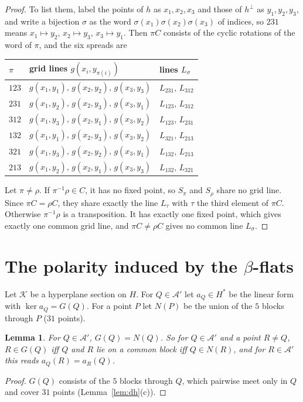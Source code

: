 \documentclass[11pt]{amsart}
\newtheorem{lemma}[theorem]{Lemma}
\theoremstyle{definition}
\newcommand{\K}{\mathcal{K}}
\newcommand{\A}{\mathcal{A}}
\begin{document}
\begin{proof}
To list them, label the points of $h$ as $x_1,x_2,x_3$ and those of $h^\perp$ as $y_1,y_2,y_3$, and write a bijection $\sigma$ as the word $\sigma(x_1)\sigma(x_2)\sigma(x_3)$ of indices, so $231$ means $x_1\mapsto y_2$, $x_2\mapsto y_3$, $x_3\mapsto y_1$. Then $\pi C$ consists of the cyclic rotations of the word of $\pi$, and the six spreads are
\begin{center}\small
\begin{tabular}{@{}lll@{}}
$\pi$ & grid lines $g(x_i,y_{\pi(i)})$ & lines $L_\sigma$\\\hline
$123$ & $g(x_1,y_1),\,g(x_2,y_2),\,g(x_3,y_3)$ & $L_{231},\,L_{312}$\\
$231$ & $g(x_1,y_2),\,g(x_2,y_3),\,g(x_3,y_1)$ & $L_{123},\,L_{312}$\\
$312$ & $g(x_1,y_3),\,g(x_2,y_1),\,g(x_3,y_2)$ & $L_{123},\,L_{231}$\\
$132$ & $g(x_1,y_1),\,g(x_2,y_3),\,g(x_3,y_2)$ & $L_{321},\,L_{213}$\\
$321$ & $g(x_1,y_3),\,g(x_2,y_2),\,g(x_3,y_1)$ & $L_{132},\,L_{213}$\\
$213$ & $g(x_1,y_2),\,g(x_2,y_1),\,g(x_3,y_3)$ & $L_{132},\,L_{321}$
\end{tabular}
\end{center}

Let $\pi\ne\rho$. If $\pi^{-1}\rho\in C$, it has no fixed point, so $S_\pi$ and $S_\rho$ share no grid line. Since $\pi C=\rho C$, they share exactly the line $L_\tau$ with $\tau$ the third element of $\pi C$. Otherwise $\pi^{-1}\rho$ is a transposition. It has exactly one fixed point, which gives exactly one common grid line, and $\pi C\ne\rho C$ gives no common line $L_\sigma$.
\end{proof}

\section{\texorpdfstring{The polarity induced by the $\beta$-flats}{The polarity induced by the beta-flats}}\label{sec:polar}

Let $\K$ be a hyperplane section on $H$. For $Q\in\A'$ let $a_Q\in H^*$ be the linear form with $\ker a_Q=G(Q)$. For a point $P$ let $N(P)$ be the union of the $5$ blocks through $P$ ($31$ points).

\begin{lemma}\label{lem:GQ}
For $Q\in\A'$, $G(Q)=N(Q)$. So for $Q\in\A'$ and a point $R\ne Q$, $R\in G(Q)$ iff $Q$ and $R$ lie on a common block iff $Q\in N(R)$, and for $R\in\A'$ this reads $a_Q(R)=a_R(Q)$.
\end{lemma}
\begin{proof}
$G(Q)$ consists of the $5$ blocks through $Q$, which pairwise meet only in $Q$ and cover $31$ points (Lemma~\ref{lem:dh}(c)).
\end{proof}
\end{document}
